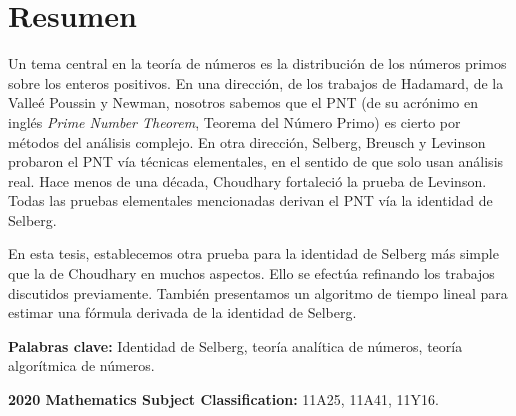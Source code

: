\chapter*{Resumen}
Un tema central en la teor\'ia de n\'umeros es la distribuci\'on
de los n\'umeros primos sobre los enteros positivos.
En una direcci\'on,
de los trabajos de
Hadamard, de la Valle\'e Poussin y Newman,
nosotros sabemos que el PNT
(de su acrónimo en inglés \textit{Prime Number Theorem}, Teorema del N\'umero Primo)
es cierto por m\'etodos del an\'alisis complejo.
En otra direcci\'on,
Selberg, Breusch y Levinson probaron el PNT
v\'ia t\'ecnicas elementales, en el sentido de que solo usan an\'alisis real.
Hace menos de una d\'ecada,
Choudhary fortaleci\'o la prueba de Levinson.
Todas las pruebas elementales mencionadas
derivan el PNT v\'ia la identidad de Selberg.

En esta tesis,
establecemos otra prueba para
la identidad de Selberg
m\'as simple que la de Choudhary en muchos aspectos.
Ello se efect\'ua
refinando los trabajos discutidos previamente.
Tambi\'en presentamos un algoritmo de tiempo lineal
para estimar una f\'ormula derivada de la identidad de Selberg.

\bigskip
\textbf{Palabras clave:}
Identidad de Selberg,
teor\'ia anal\'itica de n\'umeros,
teor\'ia algor\'itmica de n\'umeros.

\bigskip
\textbf{2020 Mathematics Subject Classification:}
11A25,
11A41,
11Y16.